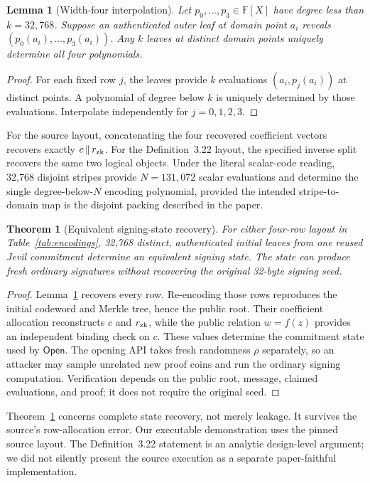 \documentclass[10pt,a4paper]{article}
\newtheorem{theorem}{Theorem}
\newtheorem{lemma}{Lemma}
\newcommand{\F}{\mathbb F}
\newcommand{\Open}{\mathsf{Open}}
\begin{document}
\begin{lemma}[Width-four interpolation]
\label{lem:interpolation}
Let $p_0,\ldots,p_3\in\F[X]$ have degree less than $k=32{,}768$. Suppose an
authenticated outer leaf at domain point $a_i$ reveals
$(p_0(a_i),\ldots,p_3(a_i))$. Any $k$ leaves at distinct domain points uniquely
determine all four polynomials.
\end{lemma}

\begin{proof}
For each fixed row $j$, the leaves provide $k$ evaluations
$(a_i,p_j(a_i))$ at distinct points. A polynomial of degree below $k$ is
uniquely determined by those evaluations. Interpolate independently for
$j=0,1,2,3$.
\end{proof}

For the source layout, concatenating the four recovered coefficient vectors
recovers exactly $c\,\|\,r_{\rm zk}$. For the Definition~3.22 layout, the
specified inverse split recovers the same two logical objects. Under the
literal scalar-code reading, 32,768 disjoint stripes provide $N=131{,}072$
scalar evaluations and determine the single degree-below-$N$ encoding
polynomial, provided the intended stripe-to-domain map is the disjoint packing
described in the paper.

\begin{theorem}[Equivalent signing-state recovery]
\label{thm:state}
For either four-row layout in Table~\ref{tab:encodings}, 32,768 distinct,
authenticated initial leaves from one reused Jevil commitment determine an
equivalent signing state. The state can produce fresh ordinary signatures
without recovering the original 32-byte signing seed.
\end{theorem}

\begin{proof}
Lemma~\ref{lem:interpolation} recovers every row. Re-encoding those rows
reproduces the initial codeword and Merkle tree, hence the public root. Their
coefficient allocation reconstructs $c$ and $r_{\rm zk}$, while the public
relation $w=f(z)$ provides an independent binding check on $c$. These values
determine the commitment state used by $\Open$. The opening API takes fresh
randomness $\rho$ separately, so an attacker may sample unrelated new proof
coins and run the ordinary signing computation. Verification depends on the
public root, message, claimed evaluations, and proof; it does not require the
original seed.
\end{proof}

Theorem~\ref{thm:state} concerns complete state recovery, not merely leakage.
It survives the source's row-allocation error. Our executable demonstration
uses the pinned source layout. The Definition~3.22 statement is an analytic
design-level argument; we did not silently present the source execution as a
separate paper-faithful implementation.
\end{document}

